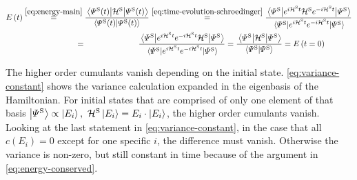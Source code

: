 \begin{equation}
    \label{eq:energy-conserved}
    \begin{split}
        \energyOft &\stackrel{\ref{eq:energy-main}}{=}
        \frac{\bracketHelper{\psiOfT[\schroedingerPicture]}{\pictureHamiltonian[\schroedingerPicture]}{\psiOfT[\schroedingerPicture]}}{\braketHelper{\psiOfT[\schroedingerPicture]}{\psiOfT[\schroedingerPicture]}}
        \stackrel{\ref{eq:time-evolution-schroedinger}}{=}
        \frac{\bracketHelper{\picturePsi[\schroedingerPicture]{}}{e^{i \pictureHamiltonian[\schroedingerPicture] t}{\pictureHamiltonian[\schroedingerPicture]}e^{-i \pictureHamiltonian[\schroedingerPicture] t}}{\picturePsi[\schroedingerPicture]{}}}{\bracketHelper{\picturePsi[\schroedingerPicture]{}}{e^{i \pictureHamiltonian[\schroedingerPicture] t}e^{-i \pictureHamiltonian[\schroedingerPicture] t}}{\picturePsi[\schroedingerPicture]{}}}\\
        &\stackrel{\phantom{\ref{eq:time-evolution-schroedinger}}}{=}
        \frac{\bracketHelper{\picturePsi[\schroedingerPicture]{}}{e^{i \pictureHamiltonian[\schroedingerPicture] t}e^{-i \pictureHamiltonian[\schroedingerPicture] t}{\pictureHamiltonian[\schroedingerPicture]}}{\picturePsi[\schroedingerPicture]{}}}{\bracketHelper{\picturePsi[\schroedingerPicture]{}}{e^{i \pictureHamiltonian[\schroedingerPicture] t}e^{-i \pictureHamiltonian[\schroedingerPicture] t}}{\picturePsi[\schroedingerPicture]{}}} = 
        \frac{\bracketHelper{\picturePsi[\schroedingerPicture]{}}{\pictureHamiltonian[\schroedingerPicture]}{\picturePsi[\schroedingerPicture]{}}}{\braketHelper{\picturePsi[\schroedingerPicture]{}}{\picturePsi[\schroedingerPicture]{}}}
         = \energyOft[t=0]
    \end{split}
\end{equation}

The higher order cumulants vanish depending on the initial state. 
\autoref{eq:variance-constant} shows the variance calculation expanded in the eigenbasis of the Hamiltonian.
For initial states that are comprised of only one element of that basis $\ketN[{\picturePsi[\schroedingerPicture]{}}] \propto \ketN[E_i],\,\,\pictureHamiltonian[\schroedingerPicture]\ketN[E_i] = E_i\cdot\ketN[E_i]$, the higher order cumulants vanish. 
Looking at the last statement in \autoref{eq:variance-constant}, in the case that all $c(E_i) = 0$ except for one specific $i$, the difference must vanish.
Otherwise the variance is non-zero, but still constant in time because of the argument in \autoref{eq:energy-conserved}.


